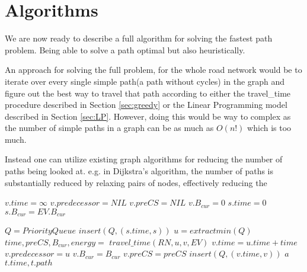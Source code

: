 \section{Algorithms}
We are now ready to describe a full algorithm for solving the fastest path problem. Being able to solve a path optimal but also heuristically. 

An approach for solving the full problem, for the whole road network would be to iterate over every single simple path(a path without cycles) in the graph and figure out the best way to travel that path according to either the travel\_time procedure described in Section \ref{sec:greedy} or the Linear Programming model described in Section \ref{sec:LP}. However, doing this would be way to complex as the number of simple paths in a graph can be as much as $O(n!)$ which is too much.

Instead one can utilize existing graph algorithms for reducing the number of paths being looked at. e.g. in Dijkstra's algorithm, the number of paths is substantially reduced by relaxing pairs of nodes, effectively reducing the


\begin{algorithmic}
        \State $v.time = \infty$
        \State $v.predecessor = NIL$
        \State $v.preCS = NIL$
        \State $v.B_{cur} = 0$
    \EndFor
    \State $s.time = 0$
    \State $s.B_{cur} = EV.B_{cur}$

    \State $Q = PriorityQueue$
    \State $insert(Q, (s.time, s))$ 
        \State $u = extractmin(Q)$
            \State $time,preCS,B_{cur},energy = $
            \State $travel\_time(RN, u, v, EV)$
                \State $v.time = u.time + time$
                \State $v.predecessor = u$
                \State $v.B_{cur} = B_{cur}$
                \State $v.preCS = preCS$
                \State $insert(Q, (v.time, v))$ 
            \EndIf
                \State $a$
            \EndIf
        \EndFor
    \EndWhile
    \State \Return $t.time, t.path$
\EndFunction
\end{algorithmic}\label{alg:fastest_path}

